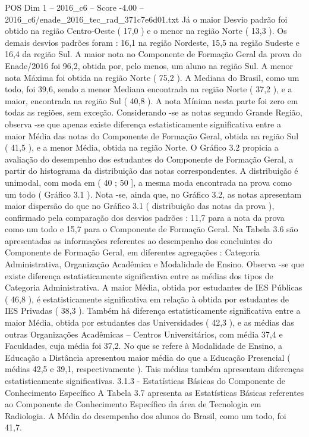 \begin{textsample}{POS Dim 1 – 2016\_c6 – Score -4.00 – 2016\_c6/enade\_2016\_tec\_rad\_371c7e6d01.txt}
Já o maior Desvio padrão foi obtido na região Centro-Oeste ( 17,0 ) e o menor na região Norte ( 13,3 ).
Os demais desvios padrões foram : 16,1 na região Nordeste, 15,5 na região Sudeste e 16,4 da região Sul.
A maior nota no Componente de Formação Geral da prova do Enade/2016 foi 96,2, obtida por, pelo menos, um aluno na região Sul.
A menor nota Máxima foi obtida na região Norte ( 75,2 ).
A Mediana do Brasil, como um todo, foi 39,6, sendo a menor Mediana encontrada na região Norte ( 37,2 ), e a maior, encontrada na região Sul ( 40,8 ).
A nota Mínima nesta parte foi zero em todas as regiões, sem exceção.
Considerando -se as notas segundo Grande Região, observa -se que apenas existe diferença estatisticamente significativa entre a maior Média das notas do Componente de Formação Geral, obtida na região Sul ( 41,5 ), e a menor Média, obtida na região Norte.
O Gráfico 3.2 propicia a avaliação do desempenho dos estudantes do Componente de Formação Geral, a partir do histograma da distribuição das notas correspondentes.
A distribuição é unimodal, com moda em ( 40 ; 50 ], a mesma moda encontrada na prova como um todo ( Gráfico 3.1 ).
Nota -se, ainda que, no Gráfico 3.2, as notas apresentam maior dispersão do que no Gráfico 3.1 ( distribuição das notas da prova ), confirmado pela comparação dos desvios padrões : 11,7 para a nota da prova como um todo e 15,7 para o Componente de Formação Geral.
Na Tabela 3.6 são apresentadas as informações referentes ao desempenho dos concluintes do Componente de Formação Geral, em diferentes agregações : Categoria Administrativa, Organização Acadêmica e Modalidade de Ensino.
Observa -se que existe diferença estatisticamente significativa entre as médias dos tipos de Categoria Administrativa.
A maior Média, obtida por estudantes de IES Públicas ( 46,8 ), é estatisticamente significativa em relação à obtida por estudantes de IES Privadas ( 38,3 ).
Também há diferença estatisticamente significativa entre a maior Média, obtida por estudantes das Universidades ( 42,3 ), e as médias das outras Organizações Acadêmicas – Centros Universitários, com média 37,4 e Faculdades, cuja média foi 37,2.
No que se refere à Modalidade de Ensino, a Educação a Distância apresentou maior média do que a Educação Presencial ( médias 42,5 e 39,1, respectivamente ).
Tais médias também apresentam diferenças estatisticamente significativas. 3.1.3 - Estatísticas Básicas do Componente de Conhecimento Específico A Tabela 3.7 apresenta as Estatísticas Básicas referentes ao Componente de Conhecimento Específico da área de Tecnologia em Radiologia.
A Média do desempenho dos alunos do Brasil, como um todo, foi 41,7.

\end{textsample}
